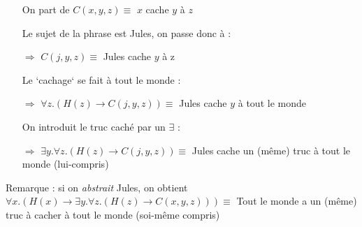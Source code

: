 \begin{frame}

\pause
{}\pause

\begin{itemize}
\item[] On part de $C(x,y,z) \equiv $ $x$ cache $y$ à $z$\pause
\end{itemize}
\vspace{1mm}
\begin{itemize}
\item[] Le sujet de la phrase est Jules, on passe donc à : \pause
\item[$\Rightarrow$] $C(j,y,z) \equiv $ Jules cache $y$ à z\pause
\end{itemize}
\vspace{1mm}
\begin{itemize}
\item[] Le `cachage` se fait à tout le monde : \pause
\item[$\Rightarrow$] $\forall z. (H(z) \rightarrow C(j,y,z)) \equiv  $ Jules cache $y$ à tout le monde\pause
\end{itemize}
\vspace{1mm}
\begin{itemize}
\item[] On introduit le truc caché par un $\exists$ : \pause
\item[$\Rightarrow$] $\exists y. \forall z. (H(z) \rightarrow C(j,y,z)) \equiv  $ Jules cache un (même) truc à tout le monde (lui-compris)\pause
\end{itemize}

Remarque : si on \textit{abstrait} Jules, on obtient $\forall x. (H(x) \rightarrow \exists y. \forall z. (H(z) \rightarrow C(x,y,z))) \equiv $ Tout le monde a un (même) truc à cacher à tout le monde (soi-même compris)

\end{frame}



